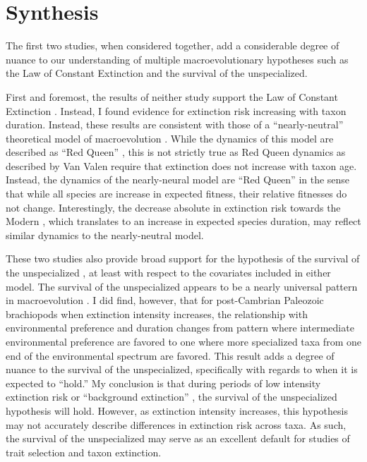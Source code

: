 \section{Synthesis}

The first two studies, when considered together, add a considerable degree of nuance to our understanding of multiple macroevolutionary hypotheses such as the Law of Constant Extinction and the survival of the unspecialized.

First and foremost, the results of neither study support the Law of Constant Extinction \citep{VanValen1973}. Instead, I found evidence for extinction risk increasing with taxon duration. Instead, these results are consistent with those of a ``nearly-neutral'' theoretical model of macroevolution \citep{Rosindell2015a}. While the dynamics of this model are described as ``Red Queen'' \citep{Rosindell2015a}, this is not strictly true as Red Queen dynamics as described by Van Valen \citep{VanValen1973} require that extinction does not increase with taxon age. Instead, the dynamics of the nearly-neural model are ``Red Queen'' in the sense that while all species are increase in expected fitness, their relative fitnesses do not change. Interestingly, the decrease absolute in extinction risk towards the Modern \citep{Raup1982a,Foote2003}, which translates to an increase in expected species duration, may reflect similar dynamics to the nearly-neutral model.

These two studies also provide broad support for the hypothesis of the survival of the unspecialized \citep{Simpson1944}, at least with respect to the covariates included in either model. The survival of the unspecialized appears to be a nearly universal pattern in macroevolution \citep{Simpson1944,Liow2004a,Liow2007b,Nurnberg2013a,Nurnberg2015,Baumiller1993,Raia2016}. I did find, however, that for post-Cambrian Paleozoic brachiopods when extinction intensity increases, the relationship with environmental preference and duration changes from pattern where intermediate environmental preference are favored to one where more specialized taxa from one end of the environmental spectrum are favored. This result adds a degree of nuance to the survival of the unspecialized, specifically with regards to when it is expected to ``hold.'' My conclusion is that during periods of low intensity extinction risk or ``background extinction'' \citep{Jablonski1986,Foote2007b}, the survival of the unspecialized hypothesis will hold. However, as extinction intensity increases, this hypothesis may not accurately describe differences in extinction risk across taxa. As such, the survival of the unspecialized may serve as an excellent default for studies of trait selection and taxon extinction.

